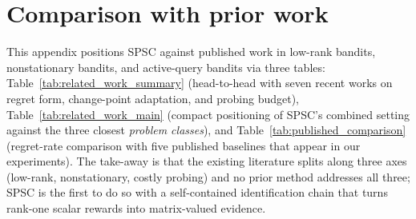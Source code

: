 \documentclass{article}
\begin{document}
\section{Comparison with prior work}
\label{app:related_table}

This appendix positions SPSC against published work in low-rank
bandits, nonstationary bandits, and active-query bandits via three
tables: Table~\ref{tab:related_work_summary} (head-to-head with seven
recent works on regret form, change-point adaptation, and probing
budget), Table~\ref{tab:related_work_main} (compact positioning of
SPSC's combined setting against the three closest \emph{problem
classes}), and Table~\ref{tab:published_comparison} (regret-rate
comparison with five published baselines that appear in our
experiments). The take-away is that the existing literature splits
along three axes (low-rank, nonstationary, costly probing) and no
prior method addresses all three; SPSC is the first to do so with a
self-contained identification chain that turns rank-one scalar
rewards into matrix-valued evidence.
\end{document}
